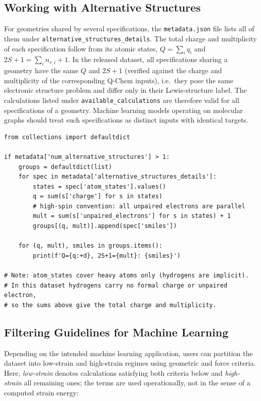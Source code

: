 \documentclass[fleqn,10pt]{article}
\begin{document}
\subsection*{Working with Alternative Structures}

For geometries shared by several specifications, the \texttt{metadata.json} file lists all of them under \texttt{alternative\_\allowbreak{}structures\_\allowbreak{}details}. The total charge and multiplicity of each specification follow from its atomic states, $Q=\sum_i q_i$ and $2S+1=\sum_i n_{r,i}+1$. In the released dataset, all specifications sharing a geometry have the same $Q$ and $2S+1$ (verified against the charge and multiplicity of the corresponding Q-Chem inputs), i.e.\ they pose the same electronic structure problem and differ only in their Lewis-structure label. The calculations listed under \texttt{available\_\allowbreak{}calculations} are therefore valid for all specifications of a geometry. Machine learning models operating on molecular graphs should treat such specifications as distinct inputs with identical targets.

\begin{verbatim}
from collections import defaultdict

if metadata['num_alternative_structures'] > 1:
    groups = defaultdict(list)
    for spec in metadata['alternative_structures_details']:
        states = spec['atom_states'].values()
        q = sum(s['charge'] for s in states)
        # high-spin convention: all unpaired electrons are parallel
        mult = sum(s['unpaired_electrons'] for s in states) + 1
        groups[(q, mult)].append(spec['smiles'])

    for (q, mult), smiles in groups.items():
        print(f'Q={q:+d}, 2S+1={mult}: {smiles}')

# Note: atom_states cover heavy atoms only (hydrogens are implicit).
# In this dataset hydrogens carry no formal charge or unpaired electron,
# so the sums above give the total charge and multiplicity.
\end{verbatim}

\subsection*{Filtering Guidelines for Machine Learning}

Depending on the intended machine learning application, users can partition the dataset into low-strain and high-strain regimes using geometric and force criteria. Here, \emph{low-strain} denotes calculations satisfying both criteria below and \emph{high-strain} all remaining ones; the terms are used operationally, not in the sense of a computed strain energy:
\end{document}
